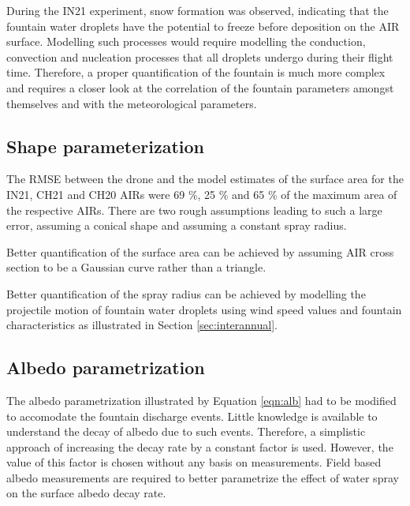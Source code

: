 
During the IN21 experiment, snow formation was observed, indicating that the fountain water droplets have the
potential to freeze before deposition on the AIR surface. Modelling such processes would require modelling the
conduction, convection and nucleation processes that all droplets undergo during their flight time. Therefore, a
proper quantification of the fountain is much more complex and requires a closer look at the correlation of the
fountain parameters amongst themselves and with the meteorological parameters.

\subsection{Shape parameterization}

The RMSE between the drone and the model estimates of the surface area for the IN21, CH21 and CH20 \ac{AIRs}
were 69 \%, 25 \% and 65 \% of the maximum area of the respective \ac{AIRs}. There are two rough assumptions
leading to such a large error, assuming a conical shape and assuming a constant spray radius.

Better quantification of the surface area can be achieved by assuming AIR cross section to be a Gaussian curve
rather than a triangle.

Better quantification of the spray radius can be achieved by modelling the projectile motion of fountain water
droplets using wind speed values and fountain characteristics as illustrated in Section \ref{sec:interannual}.


\subsection{Albedo parametrization}

The albedo parametrization illustrated by Equation \ref{eqn:alb} had to be modified to accomodate the fountain
discharge events. Little knowledge is available to understand the decay of albedo due to such events. Therefore,
a simplistic approach of increasing the decay rate by a constant factor is used. However, the value of this
factor is chosen without any basis on measurements. Field based albedo measurements are required to better
parametrize the effect of water spray on the surface albedo decay rate.

